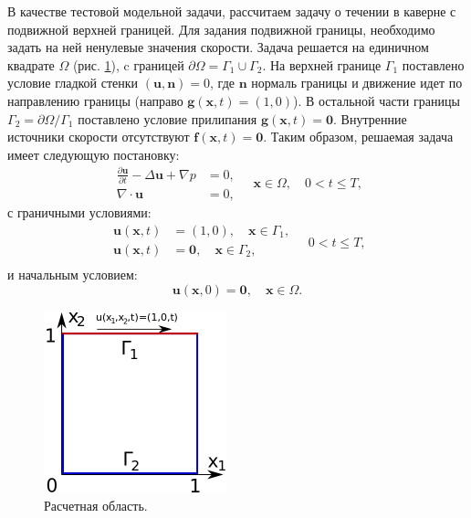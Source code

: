 \documentclass[12pt]{article}
\begin{document}
В качестве тестовой модельной задачи, рассчитаем задачу о течении в каверне с подвижной верхней границей. 
Для задания подвижной границы, необходимо задать на ней ненулевые значения скорости.
Задача решается на единичном квадрате $\Omega$ (рис. \ref{fg:cavity}), c границей $\partial \Omega=\Gamma_1 \cup \Gamma_2$. На верхней границе $\Gamma_1$ поставлено условие гладкой стенки $({\bm u}, {\bm n}) = 0$, где ${\bm n}$ нормаль границы и движение идет по направлению границы (направо ${\bm g}({\bm x},t)=(1,0)$). 
В остальной части границы $\Gamma_2=\partial \Omega / \Gamma_1$ поставлено условие прилипания ${\bm g}({\bm x}, t)={\bm 0}$. Внутренние источники скорости отсутствуют ${\bm f}({\bm x}, t)={\bm 0}$. Таким образом, решаемая задача имеет следующую постановку:
\begin{equation}
\begin{aligned}
\frac{\partial {\bm u}}{\partial t} -\Delta {\bm u} + \nabla p &= 0, \\
\nabla\cdot{\bm u} &= 0, 
\end{aligned}
\quad {\bm x} \in \Omega, \quad 0<t \leq T,
\label{eq:scheme-main}
\end{equation} 
с граничными условиями:
\begin{equation}
\begin{split}
{\bm u(\bm x, t)} &= (1, 0), \quad {\bm x} \in \Gamma_1,  \\
{\bm u(\bm x, t)} &= {\bm 0}, \quad {\bm x} \in \Gamma_2, \\
\end{split}
\quad 0<t \leq T,
\label{eq:scheme-boundary}
\end{equation} 
и начальным условием:
\begin{equation}
{\bm u(\bm x, 0)} = {\bm 0}, \quad {\bm x} \in \Omega.
\label{eq:scheme-start}
\end{equation}

\begin{figure}
	\begin{center}
		\includegraphics[width=200px]{pics/cavity400}
		\caption{Расчетная область.}
		\label{fg:cavity}
	\end{center}
\end{figure}
\end{document}
